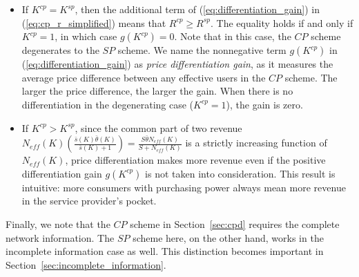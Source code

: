 \documentclass[twocolumn,10pt,twosided]{IEEEtran}
\begin{document}
\begin{itemize}
  \item If $K^{cp}=K^{sp}$, then the additional term of (\ref{eq:differentiation_gain}) in (\ref{eq:cp_r_simplified}) means that $R^{cp}\ge R^{sp}$. The equality holds if and only if $K^{cp}=1$, in which case $g(K^{cp})=0$. Note that in this case, the $CP$ scheme degenerates to the $SP$ scheme. We name the nonnegative term $g(K^{cp})$ in
(\ref{eq:differentiation_gain})  as \emph{price differentiation gain}, as it measures the average price difference between any effective users in the $CP$ scheme. The larger the price difference, the larger the gain. When there is no
differentiation in the degenerating case ($K^{cp}=1$), the gain is
zero.
  \item If $K^{cp}> K^{sp}$, since the common part of two revenue $N_{eff}(K) \left(\frac{\bar{s}(K)\bar{\theta}(K)}{\bar{s}(K)+1}\right)= \frac{S\bar{\theta}N_{eff}(K)}{S+N_{eff}(K)}$ is a strictly increasing function of $N_{eff}(K)$, price differentiation makes more revenue even if the positive differentiation gain $g(K^{cp})$ is not taken into consideration. This result is intuitive: more consumers with purchasing power  always mean more revenue in the service provider's pocket.
\end{itemize}

Finally, we note that the $CP$ scheme in Section~\ref{sec:cpd} requires the complete network information. The $SP$ scheme here, on the other hand, works in the incomplete information case as well. This distinction becomes important in Section~\ref{sec:incomplete_information}.
\end{document}
